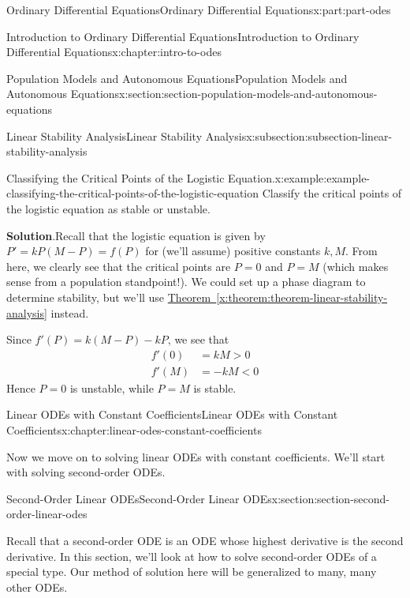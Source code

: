 \documentclass[twoside,10pt,]{book}
\newcommand{\blocktitlefont}{\relax}
\newcommand{\xreffont}{\relax}
\numberwithin{equation}{part}
\newcommand{\lt}{<}
\newcommand{\gt}{>}
\begin{document}
\begin{partptx}{Ordinary Differential Equations}{}{Ordinary Differential Equations}{}{}{x:part:part-odes}
\begin{chapterptx}{Introduction to Ordinary Differential Equations}{}{Introduction to Ordinary Differential Equations}{}{}{x:chapter:intro-to-odes}
\begin{sectionptx}{Population Models and Autonomous Equations}{}{Population Models and Autonomous Equations}{}{}{x:section:section-population-models-and-autonomous-equations}
\begin{subsectionptx}{Linear Stability Analysis}{}{Linear Stability Analysis}{}{}{x:subsection:subsection-linear-stability-analysis}
\begin{example}{Classifying the Critical Points of the Logistic Equation.}{x:example:example-classifying-the-critical-points-of-the-logistic-equation}%
Classify the critical points of the logistic equation as stable or unstable.%
\par\smallskip%
\noindent\textbf{\blocktitlefont Solution}.\hypertarget{g:solution:idp105548816434848}{}\quad{}Recall that the logistic equation is given by \(P' = kP(M-P) = f(P)\) for (we'll assume) positive constants \(k,M\). From here, we clearly see that the critical points are \(P = 0\) and \(P = M\) (which makes sense from a population standpoint!). We could set up a phase diagram to determine stability, but we'll use \hyperref[x:theorem:theorem-linear-stability-analysis]{Theorem~{\xreffont\ref{x:theorem:theorem-linear-stability-analysis}}} instead.%
\par
Since \(f'(P) = k(M-P) - kP\), we see that%
\begin{align*}
f'(0) & = kM \gt 0\\
f'(M) & = -kM \lt 0 
\end{align*}
Hence \(P = 0\) is unstable, while \(P = M\) is stable.%
\end{example}
\end{subsectionptx}
\end{sectionptx}
\end{chapterptx}
%
\typeout{************************************************}
\typeout{************************************************}
%
\begin{chapterptx}{Linear ODEs with Constant Coefficients}{}{Linear ODEs with Constant Coefficients}{}{}{x:chapter:linear-odes-constant-coefficients}
\begin{introduction}{}%
Now we move on to solving linear ODEs with constant coefficients. We'll start with solving second-order ODEs.%
\end{introduction}%
%
%
\typeout{************************************************}
\typeout{************************************************}
%
\begin{sectionptx}{Second-Order Linear ODEs}{}{Second-Order Linear ODEs}{}{}{x:section:section-second-order-linear-odes}
\begin{introduction}{}%
Recall that a second-order ODE is an ODE whose highest derivative is the second derivative. In this section, we'll look at how to solve second-order ODEs of a special type. Our method of solution here will be generalized to many, many other ODEs.%

\end{introduction}
\end{sectionptx}
\end{chapterptx}
\end{partptx}
\end{document}
